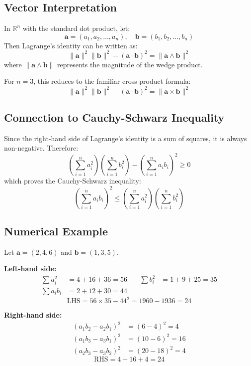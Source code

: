 \subsection*{Vector Interpretation}

In \(\mathbb{R}^n\) with the standard dot product, let:
\[
\mathbf{a} = (a_1, a_2, \ldots, a_n), \quad \mathbf{b} = (b_1, b_2, \ldots, b_n)
\]
Then Lagrange's identity can be written as:
\[
\|\mathbf{a}\|^2 \|\mathbf{b}\|^2 - (\mathbf{a} \cdot \mathbf{b})^2 = \|\mathbf{a} \wedge \mathbf{b}\|^2
\]
where \(\|\mathbf{a} \wedge \mathbf{b}\|\) represents the magnitude of the wedge product.

For \(n = 3\), this reduces to the familiar cross product formula:
\[
\|\mathbf{a}\|^2 \|\mathbf{b}\|^2 - (\mathbf{a} \cdot \mathbf{b})^2 = \|\mathbf{a} \times \mathbf{b}\|^2
\]

\subsection*{Connection to Cauchy-Schwarz Inequality}

Since the right-hand side of Lagrange's identity is a sum of squares, it is always non-negative. Therefore:
\[
\left(\sum_{i=1}^{n} a_i^2\right)\left(\sum_{i=1}^{n} b_i^2\right) - \left(\sum_{i=1}^{n} a_i b_i\right)^2 \ge 0
\]
which proves the Cauchy-Schwarz inequality:
\[
\left(\sum_{i=1}^{n} a_i b_i\right)^2 \le \left(\sum_{i=1}^{n} a_i^2\right)\left(\sum_{i=1}^{n} b_i^2\right)
\]

\subsection*{Numerical Example}

Let \(\mathbf{a} = (2, 4, 6)\) and \(\mathbf{b} = (1, 3, 5)\).

\textbf{Left-hand side:}
\[
\begin{aligned}
\sum a_i^2 &= 4 + 16 + 36 = 56 &\quad \sum b_i^2 &= 1 + 9 + 25 = 35 \\
\sum a_i b_i &= 2 + 12 + 30 = 44
\end{aligned}
\]
\[
\text{LHS} = 56 \times 35 - 44^2 = 1960 - 1936 = 24
\]

\textbf{Right-hand side:}
\[
\begin{aligned}
(a_1b_2 - a_2b_1)^2 &= (6 - 4)^2 = 4 \\
(a_1b_3 - a_3b_1)^2 &= (10 - 6)^2 = 16 \\
(a_2b_3 - a_3b_2)^2 &= (20 - 18)^2 = 4
\end{aligned}
\]
\[
\text{RHS} = 4 + 16 + 4 = 24
\]

